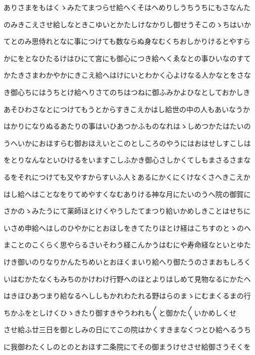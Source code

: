 \documentclass[a4paper,11pt,landscape]{ltjtarticle}
\begin{document}
\par\medskip
ありさまをもはくゝみたてまつらせ給へくそはへめりしうちうちにもさなんた
\par\medskip
のみきこえさせ給しなときこゆいとかたしけなかりし御せうそこのゝちはいか
\par\medskip
てとのみ思侍れとなに事につけても数ならぬ身なむくちおしかりけるとやすら
\par\medskip
かにをとなひたるけはひにて宮にも御心につき給へくゑなとの事ひいなのすて
\par\medskip
かたきさまわかやかにきこえ給へはけにいとわかく心よけなる人かなとをさな
\par\medskip
き御心ちにはうちとけ給へりさてのちはつねに御ふみかよひなとしておかしき
\par\medskip
あそひわさなとにつけてもうとからすきこえかはし給世の中の人もあいなうか
\par\medskip
はかりになりぬるあたりの事はいひあつかふものなれはゝしめつかたはたいの
\par\medskip
うへいかにおほすらむ御おほえいとこのとしころのやうにはおはせしすこしは
\par\medskip
をとりなんなといひけるをいますこしふかき御心さしかくてしもまさるさまな
\par\medskip
るをそれにつけても又やすからすいふ人〻あるにかくにくけなくさへきこえか
\par\medskip
はし給へはことなをりてめやすくなむありける神な月にたいのうへ院の御賀に
\par\medskip
さかのゝみたうにて薬師ほとけくやうしたてまつり給いかめしきことはせちに
\par\medskip
いさめ申給へはしのひやかにとおほしをきてたりほとけ経はこちすのとゝのへ
\par\medskip
まことのこくらく思やらるさいそわう経こんかうはむにや寿命経なといとゆた
\par\medskip
けき御いのりなりかんたちめいとおほくまいり給へり御たうのさまおもしろく
\par\medskip
いはむかたなくもみちのかけわけ行野へのほとよりはしめて見物なるにかたへ
\par\medskip
はきほひあつまり給なるへししもかれわたれる野はらのまゝにむまくるまの行
\par\medskip
ちかふをとしけくひゝきたり御すきやうわれも〱と御かた〱いかめしくせ
\par\medskip
させ給ふ廿三日を御としみの日にてこの院はかくすきまなくつとひ給へるうち
\par\medskip
に我御わたくしのとのとおほす二条院にてその御まうけせさせ給御さうそくを
\end{document}
